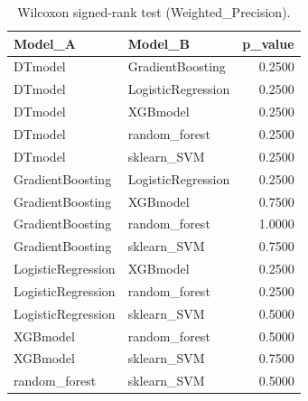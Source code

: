 \begin{table}[t]
\centering
\begin{tabular}{llr}
\toprule
Model_A & Model_B & p_value \\
\midrule
DTmodel & GradientBoosting & 0.2500 \\
DTmodel & LogisticRegression & 0.2500 \\
DTmodel & XGBmodel & 0.2500 \\
DTmodel & random_forest & 0.2500 \\
DTmodel & sklearn_SVM & 0.2500 \\
GradientBoosting & LogisticRegression & 0.2500 \\
GradientBoosting & XGBmodel & 0.7500 \\
GradientBoosting & random_forest & 1.0000 \\
GradientBoosting & sklearn_SVM & 0.7500 \\
LogisticRegression & XGBmodel & 0.2500 \\
LogisticRegression & random_forest & 0.2500 \\
LogisticRegression & sklearn_SVM & 0.5000 \\
XGBmodel & random_forest & 0.5000 \\
XGBmodel & sklearn_SVM & 0.7500 \\
random_forest & sklearn_SVM & 0.5000 \\
\bottomrule
\end{tabular}
\caption{Wilcoxon signed-rank test (Weighted_Precision).}
\label{tab:wilcoxon_Weighted_Precision}
\end{table}